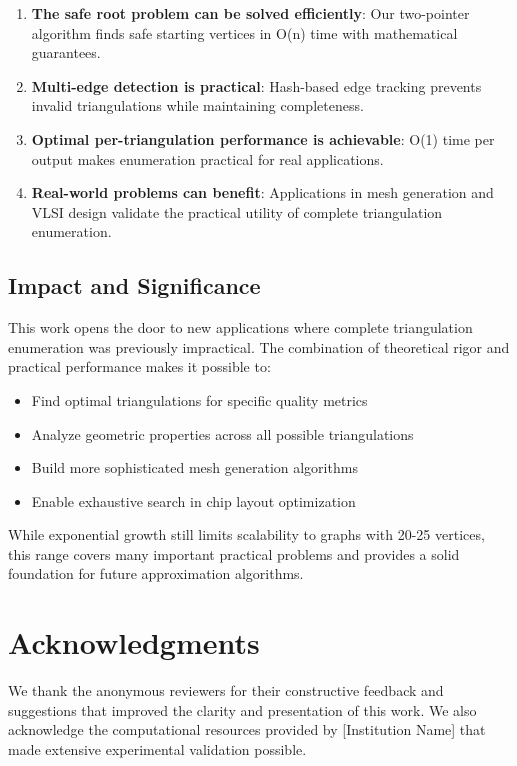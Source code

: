 \documentclass[12pt,a4paper]{article}
\begin{document}
\begin{enumerate}
    \item \textbf{The safe root problem can be solved efficiently}: Our two-pointer algorithm finds safe starting vertices in O(n) time with mathematical guarantees.
    
    \item \textbf{Multi-edge detection is practical}: Hash-based edge tracking prevents invalid triangulations while maintaining completeness.
    
    \item \textbf{Optimal per-triangulation performance is achievable}: O(1) time per output makes enumeration practical for real applications.
    
    \item \textbf{Real-world problems can benefit}: Applications in mesh generation and VLSI design validate the practical utility of complete triangulation enumeration.
\end{enumerate}

\subsection{Impact and Significance}

This work opens the door to new applications where complete triangulation enumeration was previously impractical. The combination of theoretical rigor and practical performance makes it possible to:

\begin{itemize}
    \item Find optimal triangulations for specific quality metrics
    \item Analyze geometric properties across all possible triangulations
    \item Build more sophisticated mesh generation algorithms
    \item Enable exhaustive search in chip layout optimization
\end{itemize}

While exponential growth still limits scalability to graphs with 20-25 vertices, this range covers many important practical problems and provides a solid foundation for future approximation algorithms.

\section*{Acknowledgments}

We thank the anonymous reviewers for their constructive feedback and suggestions that improved the clarity and presentation of this work. We also acknowledge the computational resources provided by [Institution Name] that made extensive experimental validation possible.
\end{document}
